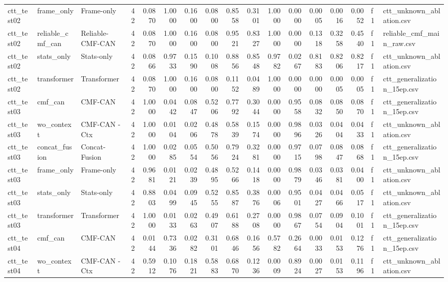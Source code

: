\begin{tabular}{lllrrrrrrrrrrrrll}
ctt\_test02 & frame\_only & Frame-only & 42 & 0.0870 & 1.0000 & 0.1600 & 0.0800 & 0.8558 & 0.3101 & 1.0000 & 0.0000 & 0.0005 & 0.0016 & 0.0052 & f1 & ctt\_unknown\_ablation.csv \\
ctt\_test02 & reliable\_cmf\_can & Reliable-CMF-CAN & 42 & 0.0870 & 1.0000 & 0.1600 & 0.0800 & 0.9521 & 0.8327 & 1.0000 & 0.0000 & 0.1318 & 0.3258 & 0.4540 & f1 & reliable\_cmf\_main\_raw.csv \\
ctt\_test02 & stats\_only & Stats-only & 42 & 0.0866 & 0.9733 & 0.1590 & 0.1008 & 0.8856 & 0.8548 & 0.9782 & 0.0267 & 0.8183 & 0.8206 & 0.8217 & f1 & ctt\_unknown\_ablation.csv \\
ctt\_test02 & transformer & Transformer & 42 & 0.0870 & 1.0000 & 0.1600 & 0.0800 & 0.1152 & 0.0489 & 1.0000 & 0.0000 & 0.0000 & 0.0005 & 0.0005 & f1 & ctt\_generalization\_15ep.csv \\
ctt\_test03 & cmf\_can & CMF-CAN & 42 & 1.0000 & 0.0442 & 0.0847 & 0.5206 & 0.7792 & 0.3044 & 0.0000 & 0.9558 & 0.0832 & 0.0850 & 0.0870 & f1 & ctt\_generalization\_15ep.csv \\
ctt\_test03 & wo\_context & CMF-CAN -Ctx & 42 & 1.0000 & 0.0104 & 0.0206 & 0.4878 & 0.5839 & 0.1574 & 0.0000 & 0.9896 & 0.0326 & 0.0404 & 0.0433 & f1 & ctt\_unknown\_ablation.csv \\
ctt\_test03 & concat\_fusion & Concat-Fusion & 42 & 1.0000 & 0.0285 & 0.0554 & 0.5056 & 0.7924 & 0.3281 & 0.0000 & 0.9715 & 0.0798 & 0.0847 & 0.0868 & f1 & ctt\_generalization\_15ep.csv \\
ctt\_test03 & frame\_only & Frame-only & 42 & 0.9681 & 0.0121 & 0.0239 & 0.4895 & 0.5266 & 0.1418 & 0.0000 & 0.9879 & 0.0346 & 0.0381 & 0.0400 & f1 & ctt\_unknown\_ablation.csv \\
ctt\_test03 & stats\_only & Stats-only & 42 & 0.8803 & 0.0499 & 0.0945 & 0.5255 & 0.8587 & 0.3876 & 0.0006 & 0.9501 & 0.0427 & 0.0466 & 0.0517 & f1 & ctt\_unknown\_ablation.csv \\
ctt\_test03 & transformer & Transformer & 42 & 1.0000 & 0.0133 & 0.0263 & 0.4907 & 0.6188 & 0.2708 & 0.0000 & 0.9867 & 0.0754 & 0.0904 & 0.1001 & f1 & ctt\_generalization\_15ep.csv \\
ctt\_test04 & cmf\_can & CMF-CAN & 42 & 0.0144 & 0.7336 & 0.0282 & 0.3101 & 0.6846 & 0.1656 & 0.5782 & 0.2664 & 0.0033 & 0.0153 & 0.1276 & f1 & ctt\_generalization\_15ep.csv \\
ctt\_test04 & wo\_context & CMF-CAN -Ctx & 42 & 0.5912 & 0.1076 & 0.1821 & 0.5883 & 0.6870 & 0.1236 & 0.0009 & 0.8924 & 0.0027 & 0.0153 & 0.1196 & f1 & ctt\_unknown\_ablation.csv \\

\end{tabular}
